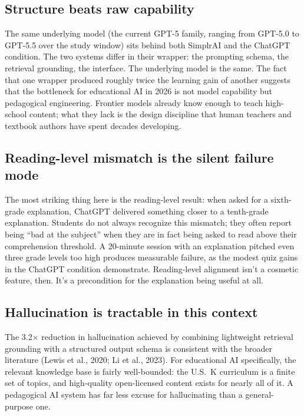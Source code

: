 \documentclass[11pt,letterpaper]{article}
\begin{document}
\subsection{Structure beats raw capability}

The same underlying model (the current GPT-5 family, ranging from GPT-5.0 to
GPT-5.5 over the study window) sits behind both SimplrAI and the ChatGPT
condition. The two systems differ in their wrapper: the prompting schema, the
retrieval grounding, the interface. The underlying model is the same. The fact
that one wrapper produced roughly twice the learning gain of another suggests
that the bottleneck for educational AI in 2026 is not model capability but
pedagogical engineering. Frontier models already know enough to teach
high-school content; what they lack is the design discipline that human
teachers and textbook authors have spent decades developing.

\subsection{Reading-level mismatch is the silent failure mode}

The most striking thing here is the reading-level result: when asked for
a sixth-grade explanation, ChatGPT delivered something closer to a tenth-grade
explanation. Students do not always recognize this mismatch; they often report
being ``bad at the subject'' when they are in fact being asked to read above
their comprehension threshold. A 20-minute session with an explanation pitched
even three grade levels too high produces measurable failure, as the modest
quiz gains in the ChatGPT condition demonstrate. Reading-level alignment isn't
a cosmetic feature, then. It's a precondition for the explanation being useful
at all.

\subsection{Hallucination is tractable in this context}

The 3.2$\times$ reduction in hallucination achieved by combining lightweight
retrieval grounding with a structured output schema is consistent with the
broader literature (Lewis et al., 2020; Li et al., 2023). For educational AI
specifically, the relevant knowledge base is fairly well-bounded: the U.S.\
K curriculum is a finite set of topics, and high-quality
open-licensed content exists for nearly all of it. A pedagogical AI system has
far less excuse for hallucinating than a general-purpose one.
\end{document}
